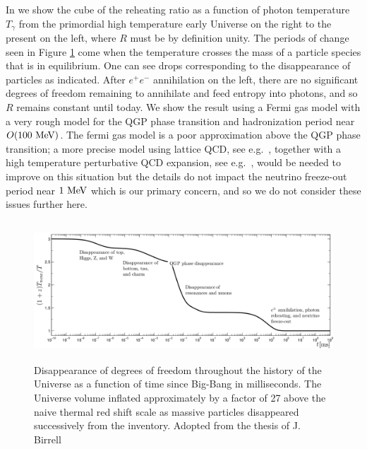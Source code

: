 In  we show the cube of the reheating ratio  as a function of photon temperature $T_\gamma$ from the primordial high temperature early Universe on the right to the present on the left, where $R$ must be by definition unity. The periods of change seen in Figure \ref{fig:dof} come when the temperature crosses the mass of a particle species that is in equilibrium. One can see drops corresponding to the disappearance of particles as indicated. After $e^+e^-$ annihilation on the left, there are no significant degrees of freedom remaining to annihilate and feed entropy into photons, and so $R$ remains constant until today. We show the result using a Fermi gas model with a very rough model for the QGP phase transition and hadronization period near $O(100\text{ MeV})$. The fermi gas model is a poor approximation above the QGP phase transition; a more precise model using lattice QCD, see e.g.~\cite{Borsanyi:2013bia}, together with a high temperature perturbative QCD expansion, see e.g.~\cite{Letessier:2002ony}, would be needed to improve on this situation but the details do not impact the neutrino freeze-out period near $1\text{ MeV}$ which is our primary concern, and so we do not consider these issues further here.

\begin{figure} 
\centerline{\includegraphics[height=5.2cm]{01-introduction/Figures/DOFtime.png}}
\caption{Disappearance of degrees of freedom throughout the history of the Universe as a function of time since Big-Bang in milliseconds. The Universe volume inflated approximately by a factor of 27 above the naive thermal red shift scale as massive particles disappeared successively from the inventory. Adopted from the thesis of J.\,Birrell~\cite{Birrell:2014ona} \label{fig:dof}}
 \end{figure}



